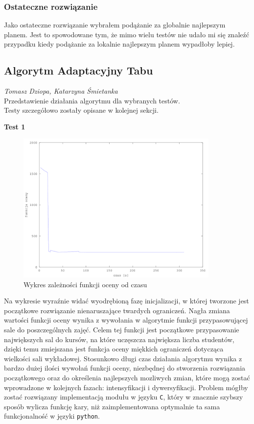 \subsubsection{Ostateczne rozwiązanie}

\par Jako ostateczne rozwiązanie wybrałem podążanie za globalnie najlepszym planem. Jest to spowodowane tym, że mimo wielu testów nie udało mi się znaleźć przypadku kiedy podążanie za lokalnie najlepszym planem wypadłoby lepiej. 
\subsection{Algorytm Adaptacyjny Tabu}
\textit{Tomasz Dziopa, Katarzyna Śmietanka}\\
Przedstawienie działania algorytmu dla wybranych testów.\\
Testy szczegółowo zostały opisane w kolejnej sekcji.
\par \textbf{Test 1}
\begin{figure}[H]
 
  \centering
    \includegraphics[width=10cm]{ogolny.png}
     \caption{Wykres zależności funkcji oceny od czasu}
\end{figure}
Na wykresie wyraźnie widać wyodrębioną fazę inicjalizacji, w której tworzone jest początkowe rozwiązanie nienaruszające twardych ograniczeń. Nagła zmiana wartości funkcji oceny wynika z wywołania w algorytmie funkcji przypasowującej sale do poszczególnych zajęć. Celem tej funkcji jest początkowe przypasowanie największych sal do kursów, na które uczęszcza największa liczba studentów, dzięki temu zmiejszana jest funkcja oceny miękkich ograniczeń dotycząca wielkości sali wykładowej. Stosunkowo długi czas działania algorytmu wynika z bardzo dużej ilości wywołań funkcji oceny, niezbędnej do stworzenia rozwiązania początkowego oraz do określenia najlepszych mozliwych zmian, które mogą zostać wprowadzone w kolejnych fazach: intensyfikacji i dywersyfikacji. Problem mógłby zostać rozwiązany implementacją modułu w języku \verb#C#, który w znacznie szybszy sposób wylicza funkcję kary, niż zaimplementowana optymalnie ta sama funkcjonalność w języki \verb#python#.
